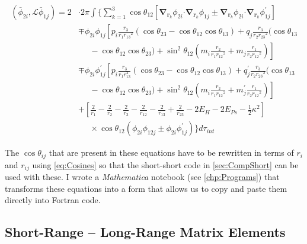 \documentclass[Dissertation.tex]{subfiles}
\begin{document}
\begin{align}
\label{eq:PWavePhi2Phi1}
\left(\bar{\phi}_{2i},\mathcal{L} \bar{\phi}_{1j}\right) = 2 & \cdot 2\pi \int \Bigg\{ \sum_{k=1}^3 \cos\theta_{12} \left[ \boldsymbol{\nabla}_{\!\mathbf{r}_k} \nonumber \phi_{2i} \boldsymbol{\cdot} \boldsymbol{\nabla}_{\!\mathbf{r}_k} \phi_{1j} \pm \boldsymbol{\nabla}_{\!\mathbf{r}_k} \phi_{2i} \boldsymbol{\cdot} \boldsymbol{\nabla}_{\!\mathbf{r}_k} \phi_{1j}^\prime \right] \\
 \nonumber &\mp \phi_{2i} \phi_{1j} \left[p_i \frac{r_3}{r_1 {r_{13}}^2} (\cos\theta_{23} - \cos\theta_{12} \cos\theta_{13}) + q_j \frac{r_3}{r_2 {r_{23}}^2}(\cos\theta_{13}\right.\\
 \nonumber & \left. \;\;\;\;\; -\cos\theta_{12} \cos\theta_{23}) + \sin^2\theta_{12} \left(m_i \frac{r_2}{r_1 {r_{12}}^2} + m_j \frac{r_1}{r_2 {r_{12}}^2} \right) \right] \\
 \nonumber &\mp \phi_{2i} \phi_{1j}^\prime \left[p_i \frac{r_3}{r_1 r_{13}^2} (\cos\theta_{23} - \cos\theta_{12} \cos\theta_{13}) + q_j^\prime \frac{r_3}{r_2 {r_{23}}^2}(\cos\theta_{13}\right.\\
 \nonumber & \left. \;\;\;\;\; -\cos\theta_{12} \cos\theta_{23}) + \sin^2\theta_{12} \left(m_i \frac{r_2}{r_1 {r_{12}}^2} + m_j^\prime \frac{r_1}{r_2 {r_{12}}^2} \right) \right] \\
 \nonumber &+ \left. \left[\frac{2}{r_1} - \frac{2}{r_2} - \frac{2}{r_3} - \frac{2}{r_{12}} - \frac{2}{r_{13}} + \frac{2}{r_{23}} - 2 E_H - 2 E_{Ps} - \frac{1}{2}\kappa^2 \right] \right. \\
 &\;\;\;\;\; \times \cos\theta_{12} \left(\phi_{2i} \phi_{12j} \pm \phi_{2i} \phi_{1j}^\prime \right) \Bigg\} d\tau_{int}
\end{align}

The $\cos\theta_{ij}$ that are present in these equations have to be rewritten in
terms of $r_i$ and $r_{ij}$ using \cref{eq:Cosines} so that the short-short
code in \cref{sec:CompShort} can be used with these.
I wrote a \emph{Mathematica} notebook
(see \cref{chp:Programs}) that transforms
these equations into a form that allows us to copy and paste them directly
into Fortran code.


\subsection{Short-Range -- Long-Range Matrix Elements}
\label{sec:PWaveShortLong}
\end{document}
